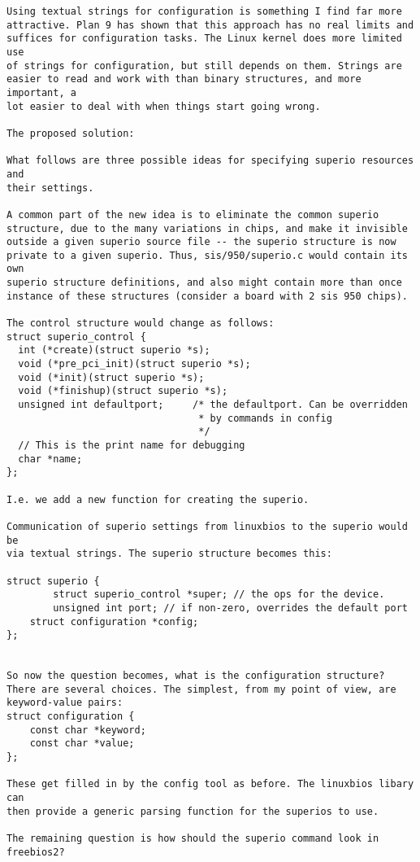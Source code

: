 \begin{verbatim}
Using textual strings for configuration is something I find far more 
attractive. Plan 9 has shown that this approach has no real limits and 
suffices for configuration tasks. The Linux kernel does more limited use 
of strings for configuration, but still depends on them. Strings are 
easier to read and work with than binary structures, and more important, a 
lot easier to deal with when things start going wrong. 

The proposed solution:

What follows are three possible ideas for specifying superio resources and 
their settings. 

A common part of the new idea is to eliminate the common superio
structure, due to the many variations in chips, and make it invisible
outside a given superio source file -- the superio structure is now
private to a given superio. Thus, sis/950/superio.c would contain its own
superio structure definitions, and also might contain more than once
instance of these structures (consider a board with 2 sis 950 chips).

The control structure would change as follows:
struct superio_control {
  int (*create)(struct superio *s);
  void (*pre_pci_init)(struct superio *s);
  void (*init)(struct superio *s);
  void (*finishup)(struct superio *s);
  unsigned int defaultport;     /* the defaultport. Can be overridden
                                 * by commands in config
                                 */
  // This is the print name for debugging
  char *name;
};

I.e. we add a new function for creating the superio. 

Communication of superio settings from linuxbios to the superio would be 
via textual strings. The superio structure becomes this:

struct superio {
        struct superio_control *super; // the ops for the device.
        unsigned int port; // if non-zero, overrides the default port
	struct configuration *config;
};


So now the question becomes, what is the configuration structure? 
There are several choices. The simplest, from my point of view, are
keyword-value pairs:
struct configuration {
	const char *keyword;
	const char *value;
};

These get filled in by the config tool as before. The linuxbios libary can 
then provide a generic parsing function for the superios to use. 

The remaining question is how should the superio command look in 
freebios2? 


\end{verbatim}
